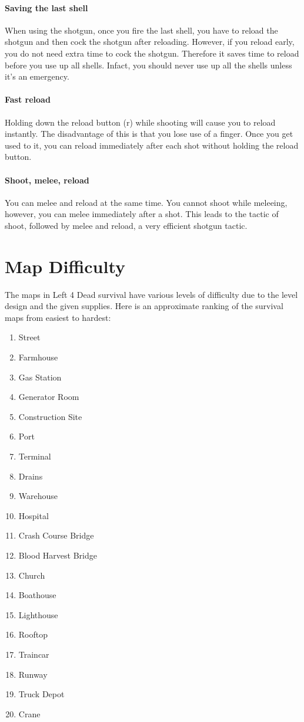 \paragraph{Saving the last shell}
When using the shotgun, once you fire the last shell, you have to reload the shotgun and then cock the shotgun after reloading. However, if you reload early, you do not need extra time to cock the shotgun. Therefore it saves time to reload before you use up all shells. Infact, you should never use up all the shells unless it's an emergency.

\paragraph{Fast reload}
Holding down the reload button (r) while shooting will cause you to reload instantly. The disadvantage of this is that you lose use of a finger. Once you get used to it, you can reload immediately after each shot without holding the reload button.

\paragraph{Shoot, melee, reload}
You can melee and reload at the same time. You cannot shoot while meleeing, however, you can melee immediately after a shot. This leads to the tactic of shoot, followed by melee and reload, a very efficient shotgun tactic.

\section{Map Difficulty}
The maps in Left 4 Dead survival have various levels of difficulty due to the level design and the given supplies. Here is an approximate ranking of the survival maps from easiest to hardest:
\begin{enumerate}
\item Street
\item Farmhouse
\item Gas Station
\item Generator Room
\item Construction Site
\item Port
\item Terminal
\item Drains
\item Warehouse
\item Hospital
\item Crash Course Bridge
\item Blood Harvest Bridge
\item Church
\item Boathouse
\item Lighthouse
\item Rooftop
\item Traincar
\item Runway
\item Truck Depot
\item Crane
\end{enumerate}

